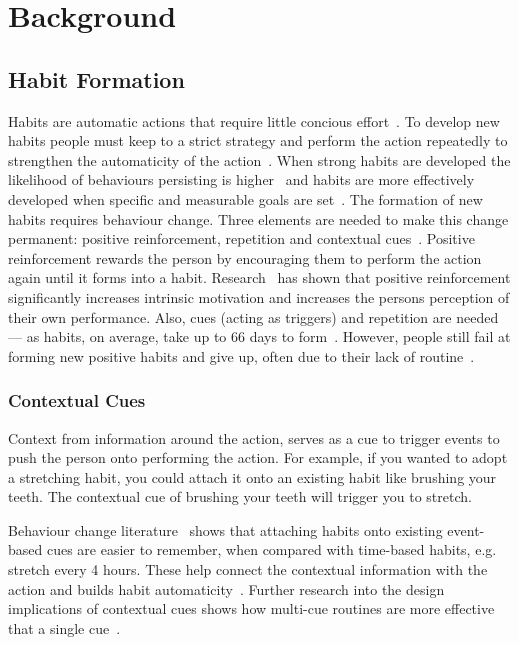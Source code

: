 \newpage

\section{Background}

\subsection{Habit Formation}
Habits are automatic actions that require little concious effort~\cite{article_the_habitual_consumer}. To develop new habits people must keep to a strict strategy and perform the action repeatedly to strengthen the automaticity of the action~\cite{article_promoting_habit_formation}. When strong habits are developed the likelihood of behaviours persisting is higher~\cite{putting_habit_into_practice} and habits are more effectively developed when specific and measurable goals are set~\cite{habits_better_when_have_specific_and_measurable_goals}. The formation of new habits requires behaviour change. Three elements are needed to make this change permanent: positive reinforcement, repetition and contextual cues~\cite{article_experiences_of_habit_formation}. Positive reinforcement rewards the person by encouraging them to perform the action again until it forms into a habit. Research~\cite{positive_reinforcement_pro} has shown that positive reinforcement significantly increases intrinsic motivation and increases the persons perception of their own performance. Also, cues (acting as triggers) and repetition are needed --- as habits, on average, take up to 66 days to form~\cite{article_how_habits_formed_modelling_habit_formation}.
However, people still fail at forming new positive habits and give up, often due to their lack of routine~\cite{article_promoting_habit_formation, article_the_habitual_consumer}.

\subsubsection*{Contextual Cues}
Context from information around the action, serves as a cue to trigger events to push the person onto performing the action. For example, if you wanted to adopt a stretching habit, you could attach it onto an existing habit like brushing your teeth. The contextual cue of brushing your teeth will trigger you to stretch.

Behaviour change literature~\cite{article_implementation_intentions_multicue} shows that attaching habits onto existing event-based cues are easier to remember, when compared with time-based habits, e.g. stretch every 4 hours. These help connect the contextual information with the action and builds habit automaticity~\cite{article_implementation_intentions}. Further research into the design implications of contextual cues shows how multi-cue routines are more effective that a single cue~\cite{article_understanding_use_contextual_cues_design_impl}.


